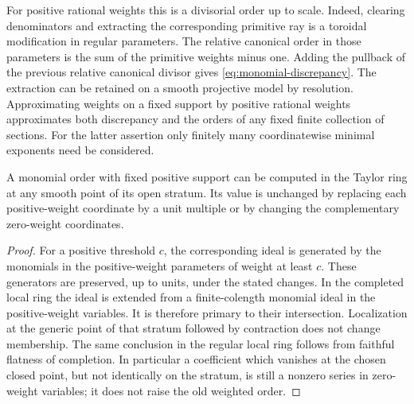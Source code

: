For positive rational weights this is a divisorial order up to scale.
Indeed, clearing denominators and extracting the corresponding
primitive ray is a toroidal modification in regular parameters. The
relative canonical order in those parameters is the sum of the
primitive weights minus one. Adding the pullback of the previous
relative canonical divisor gives
\eqref{eq:monomial-discrepancy}. The extraction can be retained on a
smooth projective model by resolution. Approximating weights on a
fixed support by positive rational weights approximates both
discrepancy and the orders of any fixed finite collection of sections.
For the latter assertion only finitely many coordinatewise minimal
exponents need be considered.

\begin{lemma}\label{lem:monomial-local}
A monomial order with fixed positive support can be computed in the
Taylor ring at any smooth point of its open stratum. Its value is
unchanged by replacing each positive-weight coordinate by a unit
multiple or by changing the complementary zero-weight coordinates.
\end{lemma}
\begin{proof}
For a positive threshold $c$, the corresponding ideal is generated by
the monomials in the positive-weight parameters of weight at least
$c$. These generators are preserved, up to units, under the stated
changes. In the completed local ring the ideal is extended from a
finite-colength monomial ideal in the positive-weight variables. It
is therefore primary to their intersection. Localization at the
generic point of that stratum followed by contraction does not change
membership. The same conclusion in the regular local ring follows
from faithful flatness of completion. In particular a coefficient
which vanishes at the chosen closed point, but not identically on the
stratum, is still a nonzero series in zero-weight variables; it does
not raise the old weighted order.
\end{proof}

